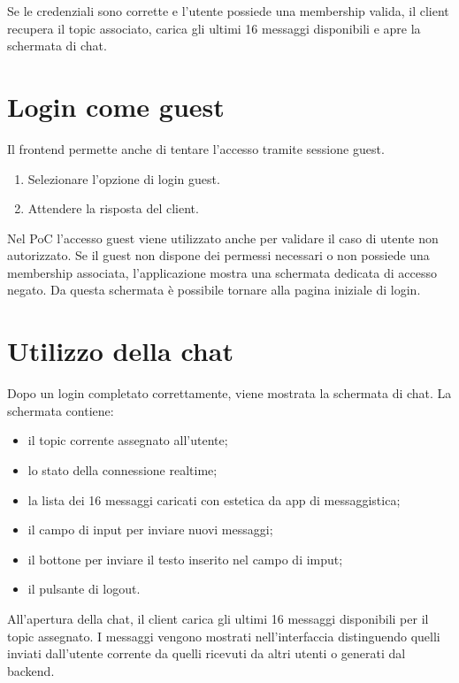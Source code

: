 \documentclass[a4paper, 11pt, twoside]{report}
\begin{document}
\noindent Se le credenziali sono corrette e l'utente possiede una membership valida, il client recupera il topic associato, carica gli ultimi 16 messaggi disponibili e apre la schermata di chat.

\section{Login come guest}

\noindent Il frontend permette anche di tentare l'accesso tramite sessione guest.

\begin{enumerate}
    \item Selezionare l'opzione di login guest.
    \item Attendere la risposta del client.
\end{enumerate}

\noindent Nel PoC l'accesso guest viene utilizzato anche per validare il caso di utente non autorizzato. Se il guest non dispone dei permessi necessari o non possiede una membership associata, l'applicazione mostra una schermata dedicata di accesso negato. Da questa schermata è possibile tornare alla pagina iniziale di login.

\section{Utilizzo della chat}

Dopo un login completato correttamente, viene mostrata la schermata di chat. La schermata contiene:

\begin{itemize}
    \item il topic corrente assegnato all'utente;
    \item lo stato della connessione realtime;
    \item la lista dei 16 messaggi caricati con estetica da app di messaggistica;
    \item il campo di input per inviare nuovi messaggi;
    \item il bottone per inviare il testo inserito nel campo di imput;
    \item il pulsante di logout.
\end{itemize}

\noindent All'apertura della chat, il client carica gli ultimi 16 messaggi disponibili per il topic assegnato. I messaggi vengono mostrati nell'interfaccia distinguendo quelli inviati dall'utente corrente da quelli ricevuti da altri utenti o generati dal backend.
\end{document}
